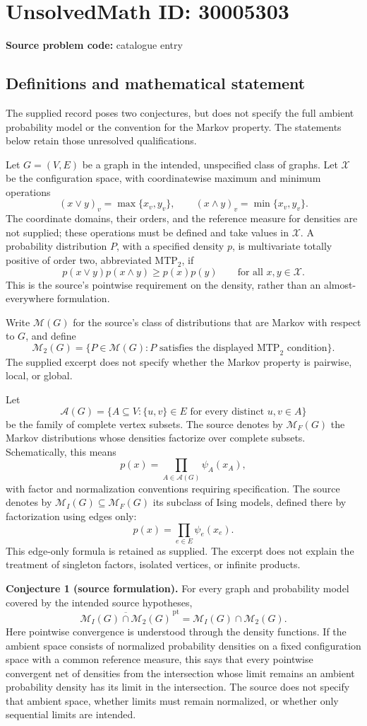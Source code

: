 \documentclass[11pt]{article}
\begin{document}
\section*{UnsolvedMath ID: 30005303}
\textbf{Source problem code:} catalogue entry
\subsection{Definitions and mathematical statement}
The supplied record poses two conjectures, but does not specify the full ambient probability model or the convention for the Markov property. The statements below retain those unresolved qualifications.

Let \(G=(V,E)\) be a graph in the intended, unspecified class of graphs. Let \(\mathcal X\) be the configuration space, with coordinatewise maximum and minimum operations
\[
(x\vee y)_v=\max\{x_v,y_v\},\qquad (x\wedge y)_v=\min\{x_v,y_v\}.
\]
The coordinate domains, their orders, and the reference measure for densities are not supplied; these operations must be defined and take values in \(\mathcal X\). A probability distribution \(P\), with a specified density \(p\), is multivariate totally positive of order two, abbreviated MTP\(_2\), if
\[
p(x\vee y)p(x\wedge y)\geq p(x)p(y)
\qquad\text{for all }x,y\in\mathcal X.
\]
This is the source's pointwise requirement on the density, rather than an almost-everywhere formulation.

Write \(\mathcal M(G)\) for the source's class of distributions that are Markov with respect to \(G\), and define
\[
\mathcal M_2(G)=\{P\in\mathcal M(G):P\text{ satisfies the displayed MTP}_2\text{ condition}\}.
\]
The supplied excerpt does not specify whether the Markov property is pairwise, local, or global.

Let
\[
\mathcal A(G)=\{A\subseteq V:\{u,v\}\in E\text{ for every distinct }u,v\in A\}
\]
be the family of complete vertex subsets. The source denotes by \(\mathcal M_F(G)\) the Markov distributions whose densities factorize over complete subsets. Schematically, this means
\[
p(x)=\prod_{A\in\mathcal A(G)}\psi_A(x_A),
\]
with factor and normalization conventions requiring specification. The source denotes by \(\mathcal M_I(G)\subseteq\mathcal M_F(G)\) its subclass of Ising models, defined there by factorization using edges only:
\[
p(x)=\prod_{e\in E}\psi_e(x_e).
\]
This edge-only formula is retained as supplied. The excerpt does not explain the treatment of singleton factors, isolated vertices, or infinite products.

\textbf{Conjecture 1 (source formulation).} For every graph and probability model covered by the intended source hypotheses,
\[
\overline{\mathcal M_I(G)\cap\mathcal M_2(G)}^{\,\mathrm{pt}}
=\mathcal M_I(G)\cap\mathcal M_2(G).
\]
Here pointwise convergence is understood through the density functions. If the ambient space consists of normalized probability densities on a fixed configuration space with a common reference measure, this says that every pointwise convergent net of densities from the intersection whose limit remains an ambient probability density has its limit in the intersection. The source does not specify that ambient space, whether limits must remain normalized, or whether only sequential limits are intended.
\end{document}
